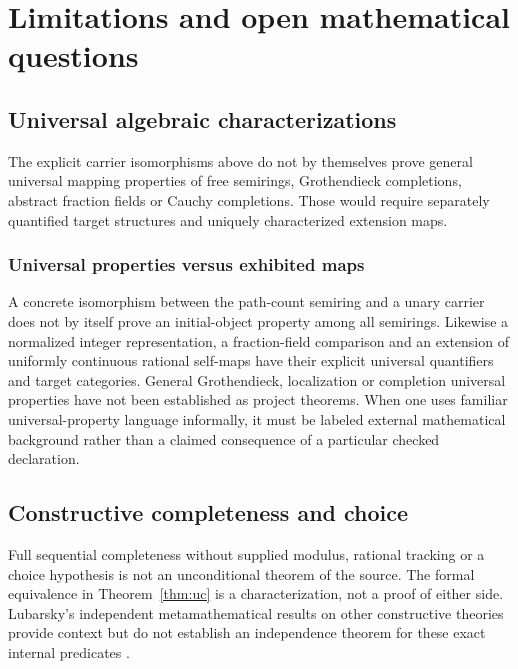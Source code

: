 \documentclass[11pt,reqno]{amsart}
\theoremstyle{definition}\newtheorem{definition}[theorem]{Definition}
\theoremstyle{remark}\newtheorem{remark}[theorem]{Remark}
\begin{document}
\clearpage
\section{Limitations and open mathematical questions}\label{sec:limitations}
\subsection{Universal algebraic characterizations}\label{main:sub-60}
The explicit carrier isomorphisms above do not by themselves prove general universal mapping properties of free semirings, Grothendieck completions, abstract fraction fields or Cauchy completions. Those would require separately quantified target structures and uniquely characterized extension maps.

\medskip
\subsubsection*{Universal properties versus exhibited maps}\label{supp:16-1}
A concrete isomorphism between the path-count semiring and a unary carrier does not by itself prove an initial-object property among all semirings. Likewise a normalized integer representation, a fraction-field comparison and an extension of uniformly continuous rational self-maps have their explicit universal quantifiers and target categories. General Grothendieck, localization or completion universal properties have not been established as project theorems. When one uses familiar universal-property language informally, it must be labeled external mathematical background rather than a claimed consequence of a particular checked declaration.
\medskip

\subsection{Constructive completeness and choice}\label{main:sub-61}
Full sequential completeness without supplied modulus, rational tracking or a choice hypothesis is not an unconditional theorem of the source. The formal equivalence in Theorem~\ref{thm:uc} is a characterization, not a proof of either side. Lubarsky's independent metamathematical results on other constructive theories provide context but do not establish an independence theorem for these exact internal predicates \cite{lubarsky}.

\medskip
\end{document}
